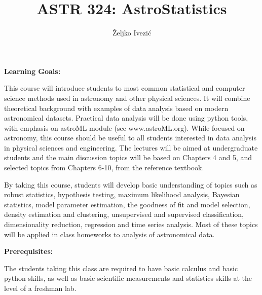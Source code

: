 \documentclass[10pt]{article}
\title{ASTR 324: AstroStatistics}
\author{\v{Z}eljko Ivezi\'{c}}
\affil{University of Washington, Spring Quarter 2026}
\date{\vspace{-5ex}}
\begin{document}
\maketitle

\vskip 0.3in

\vskip 0.2in
\vskip 0.2in
\vskip 0.2in
\vskip 0.2in
\vskip 0.3in

{\bf Learning Goals:}

This course will introduce students to most common statistical and computer science methods 
used in astronomy and other physical sciences. It will combine theoretical background with 
examples of data analysis based on modern astronomical datasets. Practical data analysis 
will be done using python tools, with emphasis on astroML module (see www.astroML.org). 
While focused on astronomy, this course should be useful to all students interested in data 
analysis in physical sciences and engineering. The lectures will be aimed at undergraduate 
students and the main discussion topics will be based on  Chapters 4 and 5, and selected 
topics from Chapters 6-10, from the reference textbook. 

By taking this course, students will develop basic understanding of topics such as robust 
statistics, hypothesis testing, maximum likelihood analysis, Bayesian statistics, model 
parameter estimation, the goodness of fit and model selection, density estimation and 
clustering, unsupervised and supervised classification, dimensionality reduction, 
regression and time series analysis. Most of these topics will be applied in class homeworks 
to analysis of astronomical data. 

{\bf Prerequisites:}

The students taking this class are required to have basic calculus and basic python skills, 
as well as basic scientific measurements and statistics skills at the level of a freshman lab. 
\end{document}
